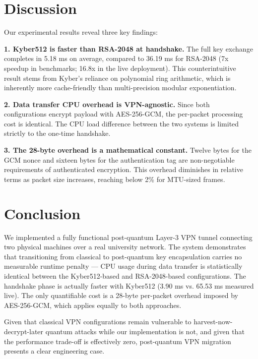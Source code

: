 \documentclass[conference]{IEEEtran}
\begin{document}
\section{Discussion}

Our experimental results reveal three key findings:

\textbf{1. Kyber512 is faster than RSA-2048 at handshake.} The full key exchange completes in 5.18 ms on average, compared to 36.19 ms for RSA-2048 (7x speedup in benchmarks; 16.8x in the live deployment). This counterintuitive result stems from Kyber's reliance on polynomial ring arithmetic, which is inherently more cache-friendly than multi-precision modular exponentiation.

\textbf{2. Data transfer CPU overhead is VPN-agnostic.} Since both configurations encrypt payload with AES-256-GCM, the per-packet processing cost is identical. The CPU load difference between the two systems is limited strictly to the one-time handshake.

\textbf{3. The 28-byte overhead is a mathematical constant.} Twelve bytes for the GCM nonce and sixteen bytes for the authentication tag are non-negotiable requirements of authenticated encryption. This overhead diminishes in relative terms as packet size increases, reaching below 2\% for MTU-sized frames.

\section{Conclusion}

We implemented a fully functional post-quantum Layer-3 VPN tunnel connecting two physical machines over a real university network. The system demonstrates that transitioning from classical to post-quantum key encapsulation carries no measurable runtime penalty — CPU usage during data transfer is statistically identical between the Kyber512-based and RSA-2048-based configurations. The handshake phase is actually faster with Kyber512 (3.90 ms vs. 65.53 ms measured live). The only quantifiable cost is a 28-byte per-packet overhead imposed by AES-256-GCM, which applies equally to both approaches.

Given that classical VPN configurations remain vulnerable to harvest-now-decrypt-later quantum attacks while our implementation is not, and given that the performance trade-off is effectively zero, post-quantum VPN migration presents a clear engineering case.
\end{document}
